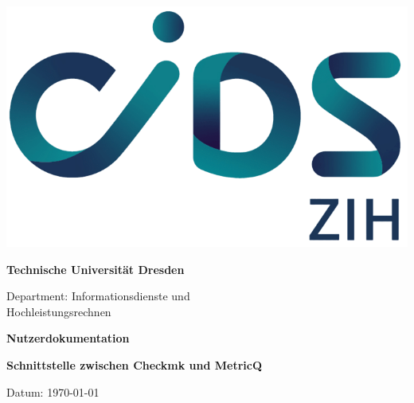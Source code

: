 \begin{titlepage}
  \centering
  \includegraphics[width=0.5\linewidth]{images/ZIH_Logo_Abk_RGB.png}\par
  \vspace{1cm}
  {\huge\bfseries Technische Universität Dresden \par}
  \vspace{1cm}
  {\Large Department: Informationsdienste und\\
  Hochleistungsrechnen\par}

  \vspace{1cm}
  \textbf{Nutzerdokumentation}\par
  \textbf{Schnittstelle zwischen Checkmk und MetricQ}\par
  \vfill

  \begin{flushleft}
    Datum: \today
  \end{flushleft}
\end{titlepage}
